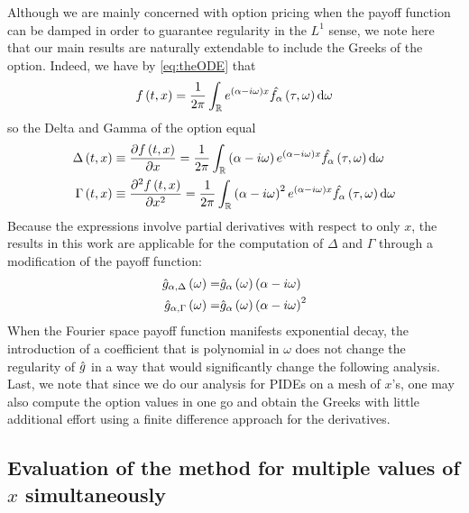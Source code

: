 \documentclass[11pt]{amsart}
\begin{document}
\begin{remark}
Although we are mainly concerned with option pricing when 
the payoff function can be damped in order to guarantee
regularity in the $L^1$ sense, we note here that our main 
results are naturally extendable to include the Greeks of the option. 
Indeed, we have by \eqref{eq:theODE} that 
\begin{align}
 f \left( {t,x} \right) = \frac{1}{2 \pi} \int_{\mathbb R} e^{\left( {\alpha - i \omega} \right)x} \hat{f_{\alpha}} \left( {\tau, \omega} \right) \textrm{d} \omega
\end{align}
so the Delta and Gamma of the option equal
\begin{align}
\Delta \left( {t,x} \right) &\equiv \frac{\partial f \left( {t,x} \right)}{\partial x} = \frac{1}{2 \pi} \int_{\mathbb R} \left( {\alpha-i \omega} \right) e^{\left( {\alpha - i \omega} \right)x} \hat{f_{\alpha}} \left( {\tau, \omega} \right) \textrm{d} \omega
\\
\Gamma \left( {t,x} \right) &\equiv \frac{\partial^2 f \left( {t,x} \right)}{\partial x^2} = \frac{1}{2 \pi} \int_{\mathbb R} \left( {\alpha-i \omega} \right)^2 e^{\left( {\alpha - i \omega} \right)x} \hat{f_{\alpha}} \left( {\tau, \omega} \right) \textrm{d} \omega
\end{align}
Because the expressions involve partial derivatives with respect to only $x$,
the results in this work are applicable for the computation of $\Delta$ and $\Gamma$
through a modification of the payoff function:
\begin{align}
\hat{g}_{\alpha, \Delta} \left( {\omega} \right) =& \hat{g}_{\alpha} \left( {\omega} \right) \left( {\alpha - i \omega} \right)
\\
\hat{g}_{\alpha, \Gamma} \left( {\omega} \right) =& \hat{g}_{\alpha} \left( {\omega} \right) \left( {\alpha-i \omega} \right)^2
\end{align}
When the Fourier space payoff function manifests
exponential decay, the introduction of a coefficient that is polynomial in $\omega$
does not change the regularity of $\hat{g}$ in a way that would significantly change the following
analysis. Last, we note that since we do our analysis for PIDEs on a mesh of
$x$'s, one may also compute the option values in one go and obtain the Greeks with
little additional effort using a finite difference approach for the derivatives.
\end{remark}

\subsection{Evaluation of the method for multiple values of $x$ simultaneously}
\end{document}

